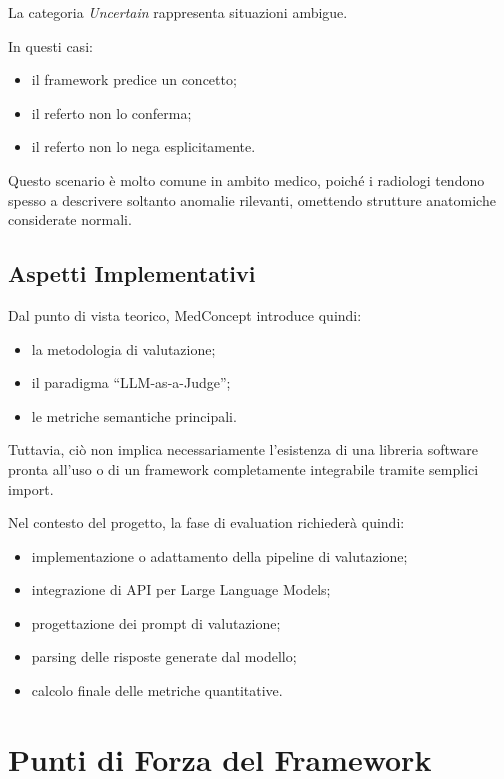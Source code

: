 La categoria \textit{Uncertain} rappresenta situazioni ambigue.

In questi casi:

\begin{itemize}
    \item il framework predice un concetto;
    \item il referto non lo conferma;
    \item il referto non lo nega esplicitamente.
\end{itemize}

Questo scenario è molto comune in ambito medico, poiché i radiologi tendono spesso a descrivere soltanto anomalie rilevanti, omettendo strutture anatomiche considerate normali.

\subsection{Aspetti Implementativi}

Dal punto di vista teorico, MedConcept introduce quindi:

\begin{itemize}
    \item la metodologia di valutazione;
    \item il paradigma ``LLM-as-a-Judge'';
    \item le metriche semantiche principali.
\end{itemize}

Tuttavia, ciò non implica necessariamente l'esistenza di una libreria software pronta all'uso o di un framework completamente integrabile tramite semplici import.

Nel contesto del progetto, la fase di evaluation richiederà quindi:

\begin{itemize}
    \item implementazione o adattamento della pipeline di valutazione;
    \item integrazione di API per Large Language Models;
    \item progettazione dei prompt di valutazione;
    \item parsing delle risposte generate dal modello;
    \item calcolo finale delle metriche quantitative.
\end{itemize}

\section{Punti di Forza del Framework}

